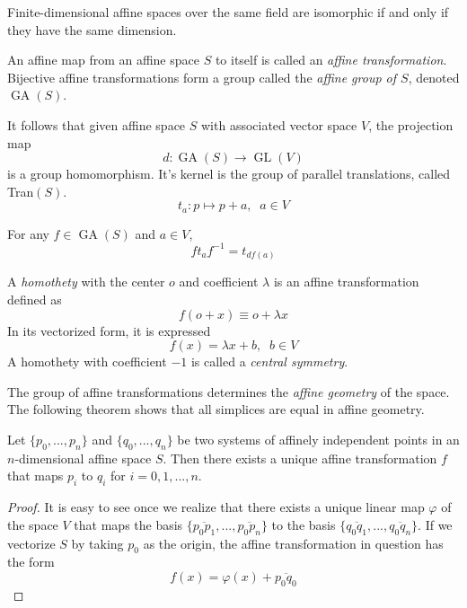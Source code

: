 \documentclass{article}
\DeclareMathOperator{\GL}{GL}
\DeclareMathOperator{\GA}{GA}
\begin{document}
    \begin{corollary}
    Finite-dimensional affine spaces over the same field are isomorphic if and only if they have the same dimension. 
    \end{corollary}

    \begin{definition}
    An affine map from an affine space $S$ to itself is called an \textit{affine transformation}. Bijective affine transformations form a group called the \textit{affine group of $S$}, denoted $\GA(S)$. 
    \end{definition}

    It follows that given affine space $S$ with associated vector space $V$, the projection map
    \[d: \GA(S) \longrightarrow \GL(V)\]
    is a group homomorphism. It's kernel is the group of parallel translations, called Tran$(S)$. 
    \[t_a : p \mapsto p + a, \;\; a \in V\]

    \begin{proposition}
    For any $f \in \GA(S)$ and $a \in V$, 
    \[f t_a f^{-1} = t_{df(a)}\]
    \end{proposition}

    \begin{definition}
    A \textit{homothety} with the center $o$ and coefficient $\lambda$ is an affine transformation defined as
    \[f( o + x ) \equiv o + \lambda x\]
    In its vectorized form, it is expressed
    \[f(x) = \lambda x + b, \;\; b \in V\]
    A homothety with coefficient $-1$ is called a \textit{central symmetry}. 
    \end{definition}

    The group of affine transformations determines the \textit{affine geometry} of the space. The following theorem shows that all simplices are equal in affine geometry. 

    \begin{theorem}
    Let $\{p_0, ..., p_n\}$ and $\{q_0, ..., q_n\}$ be two systems of affinely independent points in an $n$-dimensional affine space $S$. Then there exists a unique affine transformation $f$ that maps $p_i$ to $q_i$ for $i = 0, 1, ..., n$. 
    \end{theorem}
    \begin{proof}
    It is easy to see once we realize that there exists a unique linear map $\varphi$ of the space $V$ that maps the basis $\{\overline{p_0 p_1}, ..., \overline{p_0 p_n}\}$ to the basis $\{\overline{q_0 q_1}, ..., \overline{q_0 q_n}\}$. If we vectorize $S$ by taking $p_0$ as the origin, the affine transformation in question has the form 
    \[f(x) = \varphi(x) + \overline{p_0 q_0}\]
    \end{proof}
\end{document}
